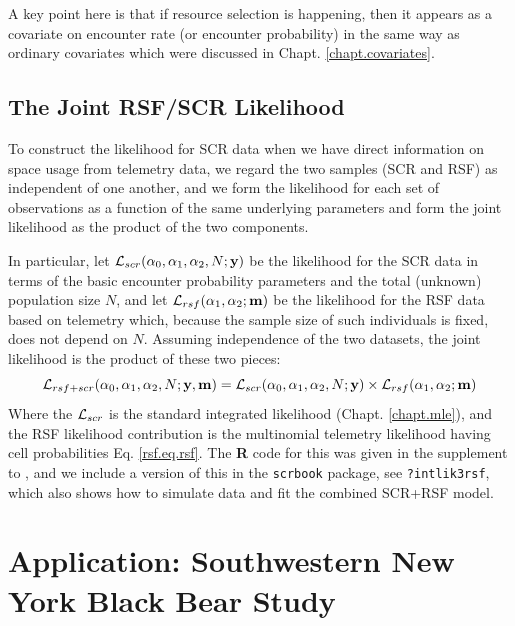 A key point here is that if resource selection is happening, then it
appears as a covariate on encounter rate (or encounter
probability) in the same way as ordinary covariates which were discussed in
Chapt. \ref{chapt.covariates}.


\subsection{The Joint RSF/SCR Likelihood}

To construct the likelihood for SCR data when we have 
direct information on space usage
from telemetry data, we regard the two samples (SCR and RSF) as
independent of one another, and we 
 form the likelihood for each set of observations as a function
of the same underlying parameters and form the joint likelihood as the
product of the two components. 

In particular, let ${\cal L}_{scr}(\alpha_{0}, \alpha_{1}, \alpha_{2}, N;{\bf y})$
be the likelihood for the SCR data in terms of the basic encounter
probability parameters and the total (unknown) population size $N$,
and let ${\cal L}_{rsf}(\alpha_{1},\alpha_{2}; {\bf m})$ be the
likelihood for the RSF data based on telemetry which, because the
sample size of such individuals is fixed, does not depend on $N$.
Assuming independence of the two datasets, the
joint likelihood is the product of these two pieces:
\[
{\cal L}_{rsf+scr}(\alpha_{0},\alpha_{1},\alpha_{2},N; {\bf y},{\bf
  m})  =
{\cal L}_{scr}(\alpha_{0}, \alpha_{1}, \alpha_{2}, N;{\bf y})
\times
{\cal L}_{rsf}(\alpha_{1},\alpha_{2}; {\bf m})
\]
Where the ${\cal L}_{scr}$ is the standard integrated likelihood
(Chapt. \ref{chapt.mle}), and the RSF likelihood contribution is the
multinomial telemetry likelihood having cell probabilities
Eq. \ref{rsf.eq.rsf}.  The {\bf R} code for this was given in the
supplement to \citet{royle_etal:2012mee}, and we include a version of
this in the \mbox{\tt scrbook} package, see \mbox{\tt ?intlik3rsf},
which also shows how to simulate data and fit the combined SCR+RSF
model.


\section{Application: Southwestern New York Black Bear Study}
\label{rsf.chapt.nybears}

